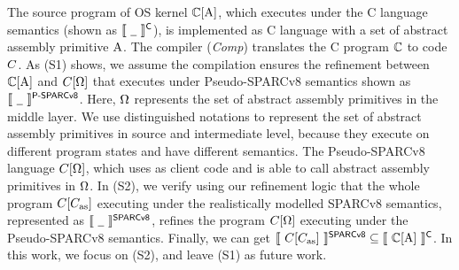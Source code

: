 

The source program of OS kernel
$\mathbb{C}[\text{A}]$, which executes
under the C language semantics (shown as
$\llbracket \ {\underline{\ \,}} \ \rrbracket^{\textsf{C}}$),
is implemented as C language
with a set of abstract assembly primitive $\text{A}$.
The compiler (\textit{Comp}) translates the
C program $\mathbb{C}$ to \sparc{} code $C$.
As {\color{blue} (S1)} shows,
we assume the compilation ensures the
refinement between $\mathbb{C}[\text{A}]$ and
$C[\Omega]$ that
executes under Pseudo-SPARCv8 semantics shown as
$\llbracket \ {\underline{\ \,}} \ \rrbracket^{\textsf{P-SPARCv8}}$.
Here, $\Omega$ represents the set of
abstract assembly primitives in the middle layer.
We use distinguished notations to represent
the set of abstract assembly primitives in source
and intermediate level, because they execute on
different program states and have different semantics.
The Pseudo-SPARCv8 language $C[\Omega]$,
which uses \sparc{} as client code and is able to
call abstract assembly primitives in $\Omega$.
In {\color{blue} (S2)},
we verify using our refinement logic that
the whole \sparc{} program
$C[C_{\text{as}}]$ executing under the realistically
modelled SPARCv8 semantics, represented as
$\llbracket \ {\underline{\ \,}} \ \rrbracket^{\textsf{SPARCv8}}$, refines
the program $C[\Omega]$ executing
under the Pseudo-SPARCv8 semantics.
Finally, we can get
$\llbracket \ {C[C_{\text{as}}]} \ \rrbracket^{\textsf{SPARCv8}}
\subseteq
\llbracket \ {\mathbb{C}[\text{A}]} \ \rrbracket^{\textsf{C}}$.
In this work, we focus on
{\color{blue} (S2)}, and
leave {\color{blue} (S1)}
as future work.

